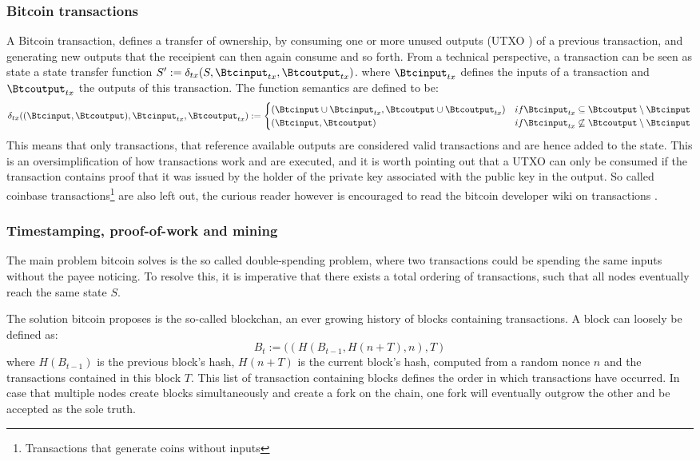 \documentclass[12pt,msc,a4paper,oneside]{ucl_thesis}
\begin{document}
\subsubsection{Bitcoin transactions}
A Bitcoin transaction, defines a transfer of ownership, by consuming one or more unused outputs (UTXO \cite{bitcoin_wiki:utxo}) of a previous transaction, and generating new outputs that the receipient can then again consume and so forth. From a technical perspective, a transaction can be seen as state a state transfer function $S' := \delta_{tx}(S, \Btcinput_{tx}, \Btcoutput_{tx})$. where $\Btcinput_{tx}$ defines the inputs of a transaction and $\Btcoutput_{tx}$ the outputs of this transaction. The function semantics are defined to be:
\begin{equation}
    \delta_{tx}((\Btcinput, \Btcoutput), \Btcinput_{tx}, \Btcoutput_{tx}) := \begin{cases}
        (\Btcinput \cup \Btcinput_{tx}, \Btcoutput \cup \Btcoutput_{tx}) & if \Btcinput_{tx} \subseteq \Btcoutput \setminus \Btcinput \\
        (\Btcinput, \Btcoutput) & if \Btcinput_{tx} \not\subseteq \Btcoutput \setminus \Btcinput
    \end{cases}
\end{equation}
This means that only transactions, that reference available outputs are considered valid transactions and are hence added to the state. This is an oversimplification of how transactions work and are executed, and it is worth pointing out that a UTXO can only be consumed if the transaction contains proof that it was issued by the holder of the private key associated with the public key in the output. So called coinbase transactions\footnote{Transactions that generate coins without inputs} are also left out, the curious reader however is encouraged to read the bitcoin developer wiki on transactions \cite{bitcoin_wiki:transactions}.

\subsubsection{Timestamping, proof-of-work and mining}
The main problem bitcoin solves is the so called double-spending problem, where two transactions could be spending the same inputs without the payee noticing. To resolve this, it is imperative that there exists a total ordering of transactions, such that all nodes eventually reach the same state $S$.

The solution bitcoin proposes is the so-called blockchan, an ever growing history of blocks containing transactions. A block can loosely be defined as:
\begin{equation}
    B_t := ((H(B_{t-1}, H(n + T), n), T)
\end{equation}
where $H(B_{t-1})$ is the previous block's hash, $H(n + T)$ is the current block's hash, computed from a random nonce $n$ and the transactions contained in this block $T$. This list of transaction containing blocks defines the order in which transactions have occurred. In case that multiple nodes create blocks simultaneously and create a fork on the chain, one fork will eventually outgrow the other and be accepted as the sole truth.
\end{document}
